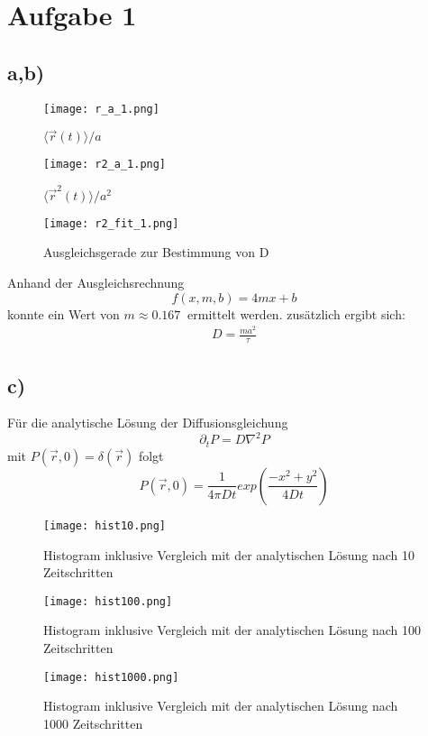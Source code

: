 \documentclass[paper=a4, ngerman]{scrartcl}
\begin{document}
\section{Aufgabe 1}
\subsection{a,b)}
\begin{figure}[htbp]
	\centering
	\texttt{[image: r\_a\_1.png]}
	\caption{$\langle \vec{r}(t)\rangle / a$}
	\label{fig:label}
\end{figure}
\begin{figure}[htbp]
	\centering
	\texttt{[image: r2\_a\_1.png]}
	\caption{$\langle \vec{r}^2(t)\rangle / a^2$}
	\label{fig:label}
\end{figure}
\begin{figure}[htbp]
	\centering
	\texttt{[image: r2\_fit\_1.png]}
	\caption{Ausgleichsgerade zur Bestimmung von D}
	\label{fig:label}
\end{figure}
Anhand der Ausgleichsrechnung 
\begin{equation}
	f(x,m,b) = 4mx+b
\end{equation} 
konnte ein Wert von $m \approx \SI{0.167}{}$ ermittelt werden.
zusätzlich ergibt sich:
\begin{align}
D = \frac{ma^2}{\tau}
\end{align}

\FloatBarrier
\subsection{c)}
Für die analytische Lösung der Diffusionsgleichung 
\begin{equation}
\partial_tP=D\nabla^2P
\end{equation}
mit $P(\vec{r},0)=\delta(\vec{r})$ folgt
\begin{equation}
	P(\vec{r},0) = \frac{1}{4\pi D t}exp(\frac{-x^2+y^2}{4Dt})
\end{equation}
\begin{figure}[htbp]
	\centering
	\texttt{[image: hist10.png]}
	\caption{Histogram inklusive Vergleich mit der analytischen Lösung nach 10 Zeitschritten}
\end{figure}
\begin{figure}[htbp]
	\centering
	\texttt{[image: hist100.png]}
	\caption{Histogram inklusive Vergleich mit der analytischen Lösung nach 100 Zeitschritten}
\end{figure}
\begin{figure}[htbp]
	\centering
	\texttt{[image: hist1000.png]}
	\caption{Histogram inklusive Vergleich mit der analytischen Lösung nach 1000 Zeitschritten}
\end{figure}
\FloatBarrier
\end{document}
